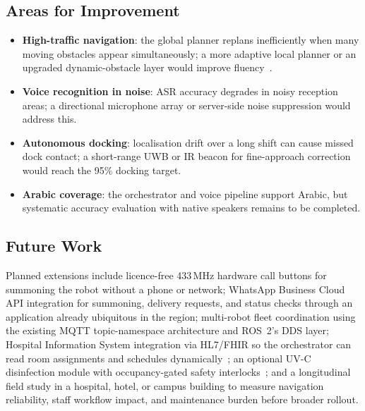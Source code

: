 \documentclass[11pt,a4paper]{article}
\begin{document}
\subsection{Areas for Improvement}
\begin{itemize}
  \item \textbf{High-traffic navigation}: the global planner replans inefficiently when many moving obstacles appear simultaneously; a more adaptive local planner or an upgraded dynamic-obstacle layer would improve fluency~\cite{chen2022}.
  \item \textbf{Voice recognition in noise}: ASR accuracy degrades in noisy reception areas; a directional microphone array or server-side noise suppression would address this.
  \item \textbf{Autonomous docking}: localisation drift over a long shift can cause missed dock contact; a short-range UWB or IR beacon for fine-approach correction would reach the 95\% docking target.
  \item \textbf{Arabic coverage}: the orchestrator and voice pipeline support Arabic, but systematic accuracy evaluation with native speakers remains to be completed.
\end{itemize}

\subsection{Future Work}
Planned extensions include licence-free 433\,MHz hardware call buttons for summoning the robot without a phone or network; WhatsApp Business Cloud API integration for summoning, delivery requests, and status checks through an application already ubiquitous in the region; multi-robot fleet coordination using the existing MQTT topic-namespace architecture and ROS~2's DDS layer; Hospital Information System integration via HL7/FHIR so the orchestrator can read room assignments and schedules dynamically~\cite{jmir2024}; an optional UV-C disinfection module with occupancy-gated safety interlocks~\cite{sciencedirect2021}; and a longitudinal field study in a hospital, hotel, or campus building to measure navigation reliability, staff workflow impact, and maintenance burden before broader rollout.

\newpage


\end{document}
